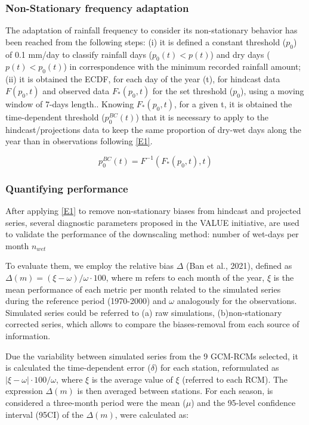 \documentclass[a4paper,11pt]{article}
\begin{document}
\subsubsection{Non-Stationary frequency adaptation} 
The adaptation of rainfall frequency to consider its non-stationary behavior has been reached from the following steps: (i) it is defined a constant threshold ($p_{0}$) of 0.1 mm/day to classify rainfall days ($p_{0}(t) < p(t)$) and dry days ($p(t) < p_{0}(t)$) in correspondence with the minimum recorded rainfall amount; (ii) it is obtained the ECDF, for each day of the year (t), for hindcast data $F(p_{0}  ,t)$ and observed data $F_{*} (p_{0}  ,t)$ for the set threshold ($p_{0}$), using a moving window of 7-days length.. Knowing $F_{*}(p_{0},t)$,  for a given t, it is obtained the time-dependent threshold ($p_0^{BC}(t)$) that it is necessary to apply to the hindcast/projections data to keep the same proportion of dry-wet days along the year than in observations following \ref{E1}.

\begin{equation}
p_0^{BC}(t) = F^{-1}(F_*(p_0,t),t)
\label{E1}
\end{equation}

\subsubsection{Quantifying performance} 
After applying \ref{E1} to remove non-stationary biases from hindcast and projected series, several diagnostic parameters proposed in the VALUE initiative, are used to validate the performance of the downscaling method: number of wet-days per month $n_{wet}$

To evaluate them, we employ the relative bias $\Delta$ (Ban et al., 2021), defined as $\Delta(m) =(\xi-\omega)/\omega \cdot 100$, where m refers to each month of the year, $\xi$ is the mean performance of each metric per month related to the simulated series during the reference period (1970-2000) and $\omega$ analogously for the observations. Simulated series could be referred to (a) raw simulations, (b)non-stationary corrected series, which allows to compare the biases-removal from each source of information. 

Due the variability between simulated series from the 9 GCM-RCMs selected, it is calculated the time-dependent error ($\delta$) for each station, reformulated as $ \lvert{\xi} - {\omega}\rvert \cdot 100/ \omega$, where ${\xi}$ is the average value of $\xi$ (referred to each RCM). The expression $\Delta(m)$ is then averaged between stations. For each season, is considered a three-month period were the mean ($\mu$) and the 95-level confidence interval (95CI) of the  $\Delta(m)$, were calculated as: 
\end{document}
